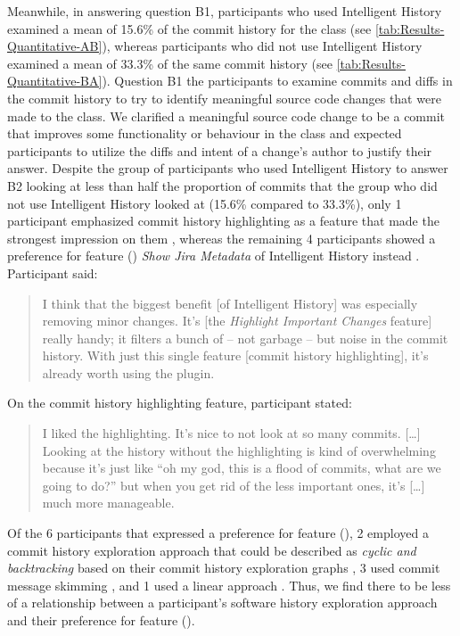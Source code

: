 Meanwhile, in answering question B1, participants who used Intelligent History 
examined a mean of 15.6\% of the commit history for the  class (see \autoref{tab:Results-Quantitative-AB}),
whereas participants who did not use Intelligent History examined a mean of 33.3\% of the same 
commit history (see \autoref{tab:Results-Quantitative-BA}).
Question B1  the participants to examine commits and diffs in the  commit history 
to try to identify meaningful source code changes that were made to the class.
We clarified a meaningful source code change to be a commit that improves some functionality 
or behaviour in the class and expected participants to utilize the diffs and intent of a change's author to justify their answer.
Despite the group of participants who used Intelligent History to answer B2 looking at less than half the 
proportion of commits that the group who did not use Intelligent History looked at (15.6\% compared to 33.3\%),
only 1 participant emphasized commit history highlighting as a feature that made the strongest impression on them , 
whereas the remaining 4 participants showed a preference for feature 
() \textit{Show Jira Metadata} of Intelligent History instead .
Participant  said:

\begin{quote}
  I think that the biggest benefit [of Intelligent History] was especially removing minor changes. 
  It’s [the \textit{Highlight Important Changes} feature] really handy; it filters a bunch of -- not garbage -- but noise in the commit history. 
  With just this single feature [commit history highlighting], it’s already worth using the plugin.
\end{quote}

On the commit history highlighting feature, participant  stated:

\begin{quote}
  I liked the highlighting. 
  It’s nice to not look at so many commits. 
  [\dots] Looking at the history without the highlighting is kind of overwhelming because it’s just like ``oh my god, this is a flood of commits, 
  what are we going to do?'' 
  but when you get rid of the less important ones, it’s [\dots] much more manageable.
\end{quote}

Of the 6 participants that expressed a preference for feature (), 
2 employed a commit history exploration approach that could be described as \textit{cyclic and backtracking} based on their commit history exploration graphs ,
3 used commit message skimming , and 1 used a linear approach .
Thus, we find there to be less of a relationship between a participant's software history exploration approach 
and their preference for feature ().

